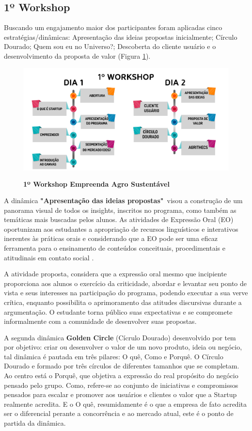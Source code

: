 \subsection{1º Workshop}

Buscando um engajamento maior dos participantes foram aplicadas cinco estratégias/dinâmicas: Apresentação das ideias propostas inicialmente; Círculo Dourado; Quem sou eu no Universo?; Descoberta do cliente usuário e o  desenvolvimento da proposta de valor (Figura \ref{figura_30}).

\begin{figure}[!h]
\centering
\caption{\textbf{1º Workshop Empreenda Agro Sustentável}}
\includegraphics[scale=0.45]{Imagens/workshop-01.png}
\label{figura_30}
\end{figure}

A dinâmica \textbf{"Apresentação das ideias propostas"}\ visou a construção de um panorama visual de todos os insights, inscritos no programa, como também as temáticas mais buscadas pelos alunos. As atividades de Expressão Oral (EO) oportunizam aos estudantes a apropriação de recursos linguísticos e interativos inerentes às práticas orais e considerando que a EO pode ser uma eficaz ferramenta para o ensinamento de conteúdos conceituais, procedimentais e atitudinais em contato social \cite{baltar_genero_2010}.

A atividade proposta, considera que a expressão oral mesmo que incipiente proporciona aos alunos o exercício da criticidade, abordar e levantar seu ponto de vista e seus interesses na participação do programa, podendo executar a sua verve crítica, enquanto possibilita o aprimoramento das atitudes discursivas durante a argumentação. O estudante torna público suas expectativas e se compromete informalmente com a comunidade de desenvolver suas propostas.

A segunda dinâmica \textbf{Golden Circle} (Cícrulo Dourado) desenvolvido por  tem por objetivo: criar ou desenvolver o valor de um novo produto, ideia ou negócio, tal dinâmica é pautada em três pilares: O quê, Como e Porquê. O Círculo Dourado e formado por três círculos de diferentes tamanhos que se completam. Ao centro está o Porquê, que objetiva a expressão do real propósito do negócio pensado pelo grupo. Como, refere-se ao conjunto de iniciativas e compromissos pensados para escalar e promover aos usuários e clientes o valor que a Startup realmente acredita. E o O quê, resumidamente é o que a empresa de fato acredita ser o diferencial perante a concorrência e ao mercado atual, este é o ponto de partida da dinâmica.


